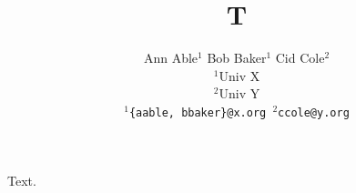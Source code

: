 \documentclass{article}
\begin{document}
\title{T}
\author{Ann Able$^1$ \quad Bob Baker$^1$ \quad Cid Cole$^2$ \\
$^1$Univ X \\
$^2$Univ Y \\
\small{\texttt{$^1$\{aable, bbaker\}@x.org \quad$^2$ccole@y.org}}}
\maketitle
Text.
\end{document}
